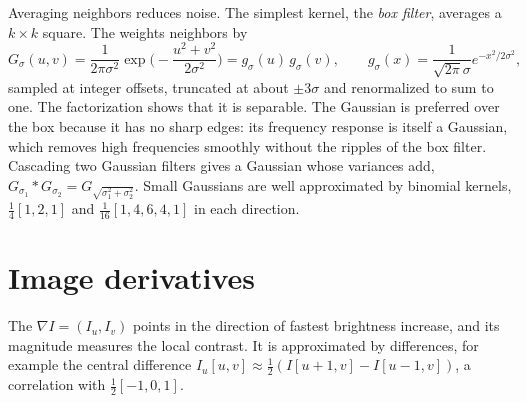 Averaging neighbors reduces noise. The simplest kernel, the \emph{box filter}, averages a $k\times k$ square. The  weights neighbors by
\begin{equation}
  G_\sigma(u, v) = \frac{1}{2\pi\sigma^2}\exp\!\Big(-\frac{u^2 + v^2}{2\sigma^2}\Big) = g_\sigma(u)\,g_\sigma(v), \qquad g_\sigma(x) = \frac{1}{\sqrt{2\pi}\sigma}e^{-x^2/2\sigma^2},
\end{equation}
sampled at integer offsets, truncated at about $\pm3\sigma$ and renormalized to sum to one. The factorization shows that it is separable. The Gaussian is preferred
over the box because it has no sharp edges: its frequency response is itself a Gaussian, which removes high frequencies smoothly without the ripples of the
box filter. Cascading two Gaussian filters gives a Gaussian whose variances add, $G_{\sigma_1}*G_{\sigma_2} = G_{\sqrt{\sigma_1^2 + \sigma_2^2}}$. Small Gaussians are well
approximated by binomial kernels, $\tfrac14[1, 2, 1]$ and $\tfrac1{16}[1, 4, 6, 4, 1]$ in each direction.

\section{Image derivatives}
\label{sec:image-derivatives}

The  $\nabla I = (I_u, I_v)$ points in the direction of fastest brightness increase, and its magnitude measures the local contrast. It is
approximated by differences, for example the central difference $I_u[u, v] \approx \tfrac12(I[u + 1, v] - I[u - 1, v])$, a correlation with $\tfrac12[-1, 0, 1]$.

